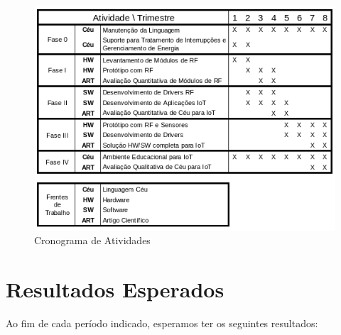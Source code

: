 \documentclass[titlepage,12pt]{article}
\begin{document}
\begin{figure}[t]
\includegraphics[width=\textwidth]{crono}
\caption{ Cronograma de Atividades \label{fig.crono} }
\end{figure}


\section{ Resultados Esperados }

Ao fim de cada período indicado, esperamos ter os seguintes resultados:
\end{document}
